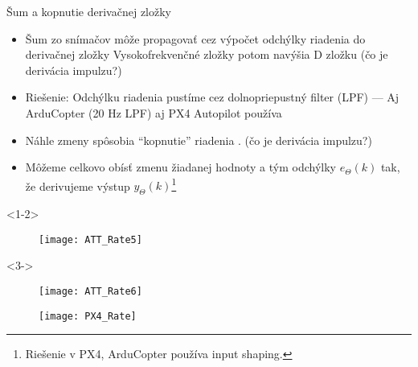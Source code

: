 \begin{frame}[t]{Šum a kopnutie derivačnej zložky}
  \begin{itemize}
    \item<1-2> Šum zo snímačov môže propagovať cez výpočet odchýlky riadenia do derivačnej zložky Vysokofrekvenčné zložky potom navýšia D zložku (čo je derivácia impulzu?)
    \item<2> Riešenie: Odchýlku riadenia pustíme cez dolnopriepustný  filter (LPF) --- Aj ArduCopter (20 Hz LPF) aj PX4 Autopilot používa \citep{AP:PID,PX4:PID}
    \item<3-> Náhle zmeny spôsobia ``kopnutie'' riadenia . (čo je derivácia impulzu?)
    \item<4-> Môžeme celkovo obísť zmenu žiadanej hodnoty a tým odchýlky  $e_\Theta(k)$ tak, že derivujeme výstup $y_\Theta(k)$\footnote{Riešenie v PX4, ArduCopter používa input shaping.}
  \end{itemize}
      \begin{onlyenv}<1-2>
  \begin{figure}
\centering
  \texttt{[image: ATT\_Rate5]}\\
\end{figure}
\end{onlyenv}

\begin{onlyenv}<3->
  \begin{figure}
\centering
  \texttt{[image: ATT\_Rate6]}\\
\end{figure}
\end{onlyenv}


\end{frame}

\begin{frame}
  \begin{figure}
\centering
  \texttt{[image: PX4\_Rate]}\\
\end{figure}

\end{frame}